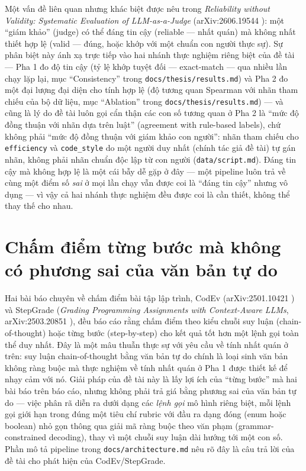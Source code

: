 \documentclass[a4paper,12pt]{report}
\begin{document}
Một vấn đề liên quan nhưng khác biệt được nêu trong \textit{Reliability
without Validity: Systematic Evaluation of LLM-as-a-Judge}
(arXiv:2606.19544 \cite{reliability_without_validity}): một ``giám khảo''
(judge) có thể đáng tin cậy (reliable — nhất quán) mà không nhất thiết hợp
lệ (valid — đúng, hoặc khớp với một chuẩn con người thực sự). Sự phân biệt
này ánh xạ trực tiếp vào hai nhánh thực nghiệm riêng biệt của đề tài — Pha
1 đo độ tin cậy (tỷ lệ khớp tuyệt đối — exact-match — qua nhiều lần chạy
lặp lại, mục ``Consistency'' trong \texttt{docs/thesis/results.md}) và Pha
2 đo một đại lượng đại diện cho tính hợp lệ (độ tương quan Spearman với
nhãn tham chiếu của bộ dữ liệu, mục ``Ablation'' trong
\texttt{docs/thesis/results.md}) — và cũng là lý do đề tài luôn gọi cẩn
thận các con số tương quan ở Pha 2 là ``mức độ đồng thuận với nhãn dựa trên
luật'' (agreement with rule-based labels), chứ không phải ``mức độ đồng
thuận với giám khảo con người'': nhãn tham chiếu cho \texttt{efficiency}
và \texttt{code\_style} do một người duy nhất (chính tác giả đề tài) tự gán
nhãn, không phải nhãn chuẩn độc lập từ con người
(\texttt{data/script.md}). Đáng tin cậy mà không hợp lệ là một cái bẫy dễ
gặp ở đây — một pipeline luôn trả về cùng một điểm số \emph{sai} ở mọi lần
chạy vẫn được coi là ``đáng tin cậy'' nhưng vô dụng — vì vậy cả hai nhánh
thực nghiệm đều được coi là cần thiết, không thể thay thế cho nhau.

\section{Chấm điểm từng bước mà không có phương sai của văn bản tự do}

Hai bài báo chuyên về chấm điểm bài tập lập trình, CodEv (arXiv:2501.10421
\cite{codev}) và StepGrade (\textit{Grading Programming Assignments with
Context-Aware LLMs}, arXiv:2503.20851 \cite{stepgrade}), đều báo cáo rằng
chấm điểm theo kiểu chuỗi suy luận (chain-of-thought) hoặc từng bước
(step-by-step) cho kết quả tốt hơn một lệnh gọi toàn thể duy nhất. Đây là
một mâu thuẫn thực sự với yêu cầu về tính nhất quán ở trên: suy luận
chain-of-thought bằng văn bản tự do chính là loại sinh văn bản không ràng
buộc mà thực nghiệm về tính nhất quán ở Pha 1 được thiết kế để nhạy cảm với
nó. Giải pháp của đề tài này là lấy lợi ích của ``từng bước'' mà hai bài
báo trên báo cáo, nhưng không phải trả giá bằng phương sai của văn bản tự
do — việc phân rã diễn ra dưới dạng các \emph{lệnh gọi} mô hình riêng biệt,
mỗi lệnh gọi giới hạn trong đúng một tiêu chí rubric với đầu ra dạng đóng
(enum hoặc boolean) nhỏ gọn thông qua giải mã ràng buộc theo văn phạm
(grammar-constrained decoding), thay vì một chuỗi suy luận dài hướng tới
một con số. Phần mô tả pipeline trong \texttt{docs/architecture.md} nêu rõ
đây là câu trả lời của đề tài cho phát hiện của CodEv/StepGrade.
\end{document}
